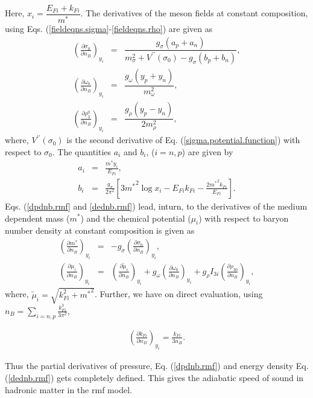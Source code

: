 \documentclass[a4paper, 11pt]{article}
\begin{document}
\noindent Here, $x_i = \dfrac{E_{Fi}+k_{Fi}}{m^*}$. The derivatives of the meson fields at constant composition, using Eqs. (\ref{fieldeqns.sigma}-\ref{fieldeqns.rho}) are given as
\begin{eqnarray}
\left(\frac{\partial \sigma_0}{\partial n_B}\right)_{y_i} &=& \dfrac{g_{\sigma} (a_p+a_n)}{m_{\sigma}^2+V^{\prime\prime}(\sigma_0)-g_{\sigma}(b_p+b_n)},
\\
\left(\frac{\partial \omega_0}{\partial n_B}\right)_{y_i} &=& \dfrac{g_{\omega}(y_p+y_n)}{m_{\omega}^2},
\\
\left(\frac{\partial \rho_{3}^0}{\partial n_B}\right)_{y_i}   &=& \dfrac{g_{\rho}(y_p-y_n)}{2m_{\rho}^2},
\end{eqnarray}
where, $V^{\prime\prime}(\sigma_0)$ is the second derivative of Eq. (\ref{sigma.potential.function}) with respect to $\sigma_0$. The quantities $a_i$ and $b_i$, ($i=n,p$) are given by 
\begin{eqnarray}
a_i &=& \frac{m^* y_i}{E_{Fi}}, \label{ai-nl3}
\\
b_i &=& \frac{g_{\sigma}}{2\pi^2}\left[3{m^*}^2\log x_i - E_{Fi}k_{Fi} - \frac{2 {m^*}^2 k_{Fi}}{E_{Fi}}\right]. \label{bi-nl3}
\end{eqnarray}
Eqs. (\ref{dpdnb.rmf} and \ref{dednb.rmf}) lead, inturn, to the derivatives of the medium dependent mass ($m^*$) and the chemical potential (${\mu}_i$) with respect to baryon number density at constant composition is given as
\begin{eqnarray}
\left(\frac{\partial m^*}{\partial n_B}\right)_{y_i} &=& -g_{\sigma} \left(\frac{\partial \sigma_0}{\partial n_B}\right)_{y_i}, \label{dmdnb.rmf}
\\
\left(\frac{\partial \mu_i}{\partial n_B}\right)_{y_i} &=& \left(\frac{\partial \tilde{\mu}_i}{\partial n_B}\right)_{y_i} + g_{\omega} \left(\frac{\partial \omega_0}{\partial n_B}\right)_{y_i} + g_{\rho} I_{3i} \left(\frac{\partial \rho_{30}}{\partial n_B}\right)_{y_i}, \label{dmudnb.rmf}
\end{eqnarray}
where, $\tilde{\mu}_i = \sqrt{k_{Fi}^2+{m^*}^2}$. Further, we have on direct evaluation, using $n_B = \sum_{i=n,p} \frac{k_{Fi}^3}{3\pi^2}$, 

\begin{eqnarray}
\left(\frac{\partial k_{Fi}}{\partial n_B}\right)_{y_i} = \frac{k_{Fi}}{3n_B}.
\end{eqnarray}

\noindent Thus the partial derivatives of pressure, Eq. (\ref{dpdnb.rmf}) and energy density Eq. (\ref{dednb.rmf}) gets completely defined. This gives the adiabatic speed of sound in hadronic matter in the \ac{rmf} model.
\end{document}

